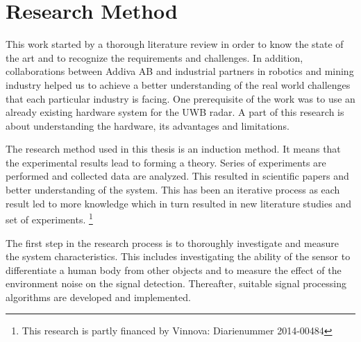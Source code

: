 \section{Research Method}

This work started by a thorough literature review in order to know the state of the art and to recognize the requirements and challenges. In addition, collaborations between Addiva AB and industrial partners in robotics and mining industry helped us to achieve a better understanding of the real world challenges that each particular industry is facing.
One prerequisite of the work was to use an already existing hardware system for the UWB radar. A part of this research is about understanding the hardware, its advantages and limitations.

The research method used in this thesis is an induction method. It means that the experimental results lead to forming a theory. Series of experiments are performed and collected data are analyzed. This resulted in scientific papers and better understanding of the system. This has been an iterative process as each result led to more knowledge which in turn resulted in new literature studies and set of experiments.
\footnote{This research is partly financed by Vinnova: Diarienummer 2014-00484}     

The first step in the research process is to thoroughly investigate and measure the system characteristics. This includes investigating the ability of the sensor to differentiate a human body from other objects and to measure the effect of the environment noise on the signal detection. Thereafter, suitable signal processing algorithms are developed and implemented. 